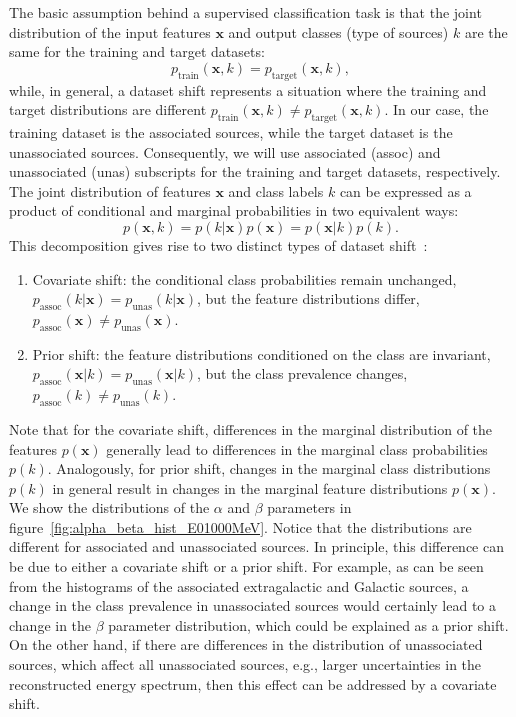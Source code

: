 \documentclass[12pt, a4paper]{article}
\newcommand{\be}{\begin{equation}}
\newcommand{\ee}{\end{equation}}
\newcommand{\ben}{\begin{enumerate}}
\newcommand{\een}{\end{enumerate}}
\newcommand{\bx}{\textbf{x}}
\begin{document}
The basic assumption behind a supervised classification task is that the joint distribution of the input features $\bx$
and output classes (type of sources) $k$  are the same for the training and target datasets:
\be
p_\textrm{train} (\bx, k) = p_\textrm{target} (\bx, k),
\ee
while, in general, a dataset shift represents a situation where the training and target distributions are different
$p_\textrm{train} (\bx, k) \neq p_\textrm{target} (\bx, k)$.
In our case, the training dataset is the associated sources, while the target dataset is the unassociated sources.
Consequently, we will use associated (assoc) and unassociated (unas) subscripts for the training and target datasets, respectively.
\\
The joint distribution of features $\bx$ and class labels $k$ can be expressed as a product of conditional and marginal probabilities in two equivalent ways:
\be
p(\bx, k) = p(k|\bx) p(\bx) = p(\bx|k) p(k).
\ee
This decomposition gives rise to two distinct types of dataset shift~\citep{MorenoTorres2012AUV}:
\ben
\item
{ Covariate shift}: the conditional class probabilities remain unchanged,\\
{$p_\textrm{assoc}(k|\bx) = p_\textrm{unas}(k|\bx)$}, but the feature distributions differ, $p_\textrm{assoc}(\bx) \neq p_\textrm{unas}(\bx)$.
\item
{ Prior shift}: the feature distributions conditioned on the class are invariant, $p_\textrm{assoc}(\bx|k) = p_\textrm{unas}(\bx|k)$, but the class prevalence changes, $p_\textrm{assoc}(k) \neq p_\textrm{unas}(k)$.
\een
Note that for the covariate shift, differences in the marginal distribution of the features $p(\bx)$ generally lead to differences in the marginal class probabilities $p(k)$.
Analogously, for prior shift, changes in the marginal class distributions $p(k)$ in general result in changes in the marginal feature distributions $p(\bx)$. We show the distributions of the $\alpha$ and $\beta$ parameters in figure~\ref{fig:alpha_beta_hist_E01000MeV}. Notice that the distributions are different for associated and unassociated sources.
In principle, this difference can be due to either a covariate shift or a prior shift. 
For example, as can be seen from the histograms of the associated extragalactic and Galactic sources, a change in the class prevalence in unassociated sources would certainly lead to a change in the $\beta$ parameter distribution, which could be explained as a prior shift.
On the other hand, if there are differences in the distribution of unassociated sources, which affect all unassociated sources, e.g., larger uncertainties in the reconstructed energy spectrum, 
then this effect can be addressed by a covariate shift.
\end{document}
